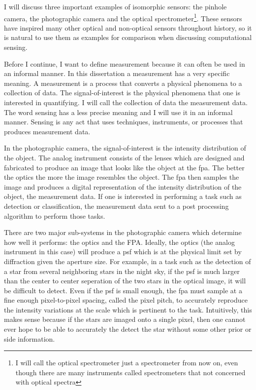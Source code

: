 I will discuss three important examples of isomorphic sensors: the pinhole camera, the photographic camera and the optical spectrometer\footnote{I will call the optical spectrometer just a spectrometer from now on, even though there are many instruments called spectrometers that not concerned with optical spectra}. These sensors have inspired many other optical and non-optical sensors throughout history, so it is natural to use them as examples for comparison when discussing computational sensing. 

Before I continue, I want to define \gls{measurement} because it can often be used in an informal manner. In this dissertation a \gls{measurement} has a very specific meaning. A \gls{measurement} is a process that converts a physical phenomena to a collection of data. The signal-of-interest is the physical phenomena that one is interested in quantifying. I will call the collection of data the measurement data.  The word sensing has a less precise meaning and I will use it in an informal manner. Sensing is any act that uses techniques, instruments, or processes that produces measurement data. 

In the photographic camera, the signal-of-interest is the intensity distribution of the object. The analog instrument consists of the lenses which are designed and fabricated to produce an image that looks like the object at the \gls{fpa}. The better the optics the more the image resembles the object. The \gls{fpa} then samples the image and produces a digital representation of the intensity distribution of the object, the measurement data. If one is interested in performing a task such as detection or classification, the measurement data sent to a post processing algorithm to perform those tasks. 

There are two major sub-systems in the photographic camera which determine how well it performs: the optics and the FPA. Ideally, the optics (the analog instrument in this case) will produce a \gls{psf} which is at the physical limit set by diffraction given the aperture size. For example, in a task such as the detection of a star from several neighboring stars in the night sky, if the \gls{psf} is much larger than the center to center seperation of the two stars in the optical image, it will be difficult to detect. Even if the \gls{psf} is small enough, the \gls{fpa} must sample at a fine enough pixel-to-pixel spacing, called the \gls{pixel pitch}, to accurately reproduce the intensity variations at the scale which is pertinent to the task. Intuitively, this makes sense because if the stars are imaged onto a single pixel, then one cannot ever hope to be able to accurately the detect the star without some other prior or side information. 

